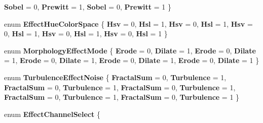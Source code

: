 \begin{DoxyCompactItemize}
{\bfseries Sobel} = 0, 
{\bfseries Prewitt} = 1, 
\newline
{\bfseries Sobel} = 0, 
{\bfseries Prewitt} = 1
 \}
\item 
\mbox{\label{namespace_microsoft_1_1_graphics_1_1_canvas_1_1_effects_ae7299c185ad53a8bf344202e319bf35a}} 
enum {\bfseries Effect\+Hue\+Color\+Space} \{ \newline
{\bfseries Hsv} = 0, 
{\bfseries Hsl} = 1, 
{\bfseries Hsv} = 0, 
{\bfseries Hsl} = 1, 
\newline
{\bfseries Hsv} = 0, 
{\bfseries Hsl} = 1, 
{\bfseries Hsv} = 0, 
{\bfseries Hsl} = 1, 
\newline
{\bfseries Hsv} = 0, 
{\bfseries Hsl} = 1
 \}
\item 
\mbox{\label{namespace_microsoft_1_1_graphics_1_1_canvas_1_1_effects_a41ef1609f91e4fdf47d735886d2d455b}} 
enum {\bfseries Morphology\+Effect\+Mode} \{ \newline
{\bfseries Erode} = 0, 
{\bfseries Dilate} = 1, 
{\bfseries Erode} = 0, 
{\bfseries Dilate} = 1, 
\newline
{\bfseries Erode} = 0, 
{\bfseries Dilate} = 1, 
{\bfseries Erode} = 0, 
{\bfseries Dilate} = 1, 
\newline
{\bfseries Erode} = 0, 
{\bfseries Dilate} = 1
 \}
\item 
\mbox{\label{namespace_microsoft_1_1_graphics_1_1_canvas_1_1_effects_a57ff6492fca7c9d4ed49c3588ec24c76}} 
enum {\bfseries Turbulence\+Effect\+Noise} \{ \newline
{\bfseries Fractal\+Sum} = 0, 
{\bfseries Turbulence} = 1, 
{\bfseries Fractal\+Sum} = 0, 
{\bfseries Turbulence} = 1, 
\newline
{\bfseries Fractal\+Sum} = 0, 
{\bfseries Turbulence} = 1, 
{\bfseries Fractal\+Sum} = 0, 
{\bfseries Turbulence} = 1, 
\newline
{\bfseries Fractal\+Sum} = 0, 
{\bfseries Turbulence} = 1
 \}
\item 
\mbox{\label{namespace_microsoft_1_1_graphics_1_1_canvas_1_1_effects_aa548de5fcafa34088d6dfff1bf77df8b}} 
enum {\bfseries Effect\+Channel\+Select} \{ \newline

\end{DoxyCompactItemize}
